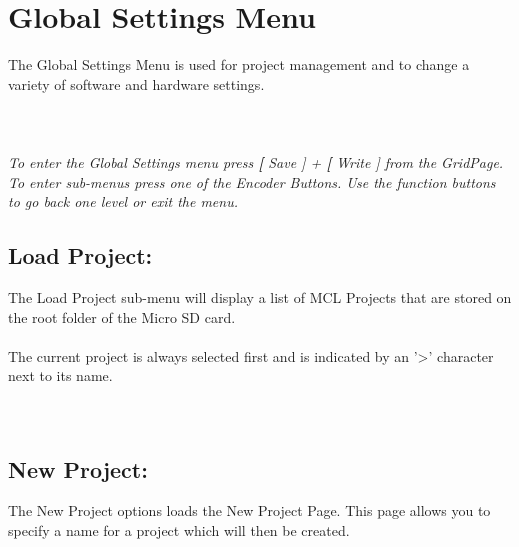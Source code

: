 \chapter{Global Settings Menu}
The Global Settings Menu is used for project management and to change a variety of software and hardware settings.\\\\
\\\\
\textit{To enter the Global Settings menu press \textbf[ Save ] + \textbf[ Write ] from the GridPage.\\
To enter sub-menus press one of the Encoder Buttons. Use the function buttons to go back one level or exit the menu.}
\section{Load Project:}
The Load Project sub-menu will display a list of MCL Projects that are stored on the root folder of the Micro SD card.\\\\
The current project is always selected first and is indicated by an '>' character next to its name.\\\\
\\
\section{New Project:}
The New Project options loads the New Project Page. This page allows you to specify a name for a project which will then be created.\\
\\
